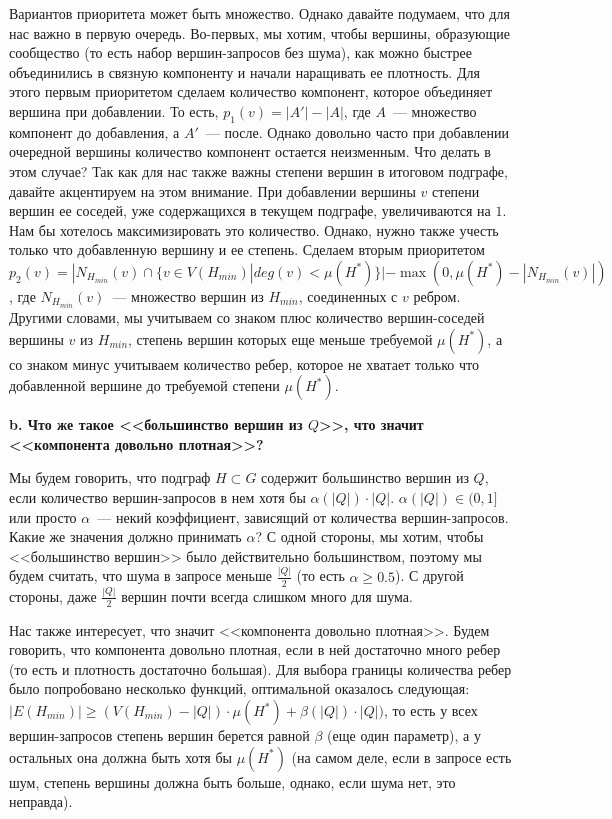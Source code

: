 Вариантов приоритета может быть множество. Однако давайте подумаем, что для нас важно в первую очередь. Во-первых, мы хотим, чтобы вершины, образующие сообщество (то есть набор вершин-запросов без шума), как можно быстрее объединились в связную компоненту и начали наращивать ее плотность. Для этого первым приоритетом сделаем количество компонент, которое объединяет вершина при добавлении. То есть, $p_1(v) = |A'| - |A|$, где $A$~--- множество компонент до добавления, а $A'$~--- после. Однако довольно часто при добавлении очередной вершины количество компонент остается неизменным. Что делать в этом случае? Так как для нас также важны степени вершин в итоговом подграфе, давайте акцентируем на этом внимание. При добавлении вершины $v$ степени вершин ее соседей, уже содержащихся в текущем подграфе, увеличиваются на $1$. Нам бы хотелось максимизировать это количество. Однако, нужно также учесть только что добавленную вершину и ее степень. Сделаем вторым приоритетом $p_2(v) = |N_{H_{min}}(v) \cap \{v \in V(H_{min}) | deg(v) < \mu(H^*)\}| - \max(0, \mu(H^*) - |N_{H_{min}}(v)|)$, где $N_{H_{min}}(v)$~--- множество вершин из $H_{min}$, соединенных с $v$ ребром. Другими словами, мы учитываем со знаком плюс количество вершин-соседей вершины $v$ из $H_{min}$, степень вершин которых еще меньше требуемой $\mu(H^*)$, а со знаком минус учитываем количество ребер, которое не хватает только что добавленной вершине до требуемой степени $\mu(H^*)$.

\textbf{b. Что же такое <<большинство вершин из $Q$>>, что значит <<компонента довольно плотная>>?}

Мы будем говорить, что подграф $H \subset G$ содержит большинство вершин из $Q$, если количество вершин-запросов в нем хотя бы $\alpha(|Q|) \cdot |Q|$. $\alpha(|Q|) \in (0, 1]$ или просто $\alpha$~--- некий коэффициент, зависящий от количества вершин-запросов. Какие же значения должно принимать $\alpha$? С одной стороны, мы хотим, чтобы <<большинство вершин>> было действительно большинством, поэтому мы будем считать, что шума в запросе меньше $\frac{|Q|}{2}$ (то есть $\alpha \ge 0.5$). С другой стороны, даже $\frac{|Q|}{2}$ вершин почти всегда слишком много для шума.  

Нас также интересует, что значит <<компонента довольно плотная>>. Будем говорить, что компонента довольно плотная, если в ней достаточно много ребер (то есть и плотность достаточно большая). Для выбора границы количества ребер было попробовано несколько функций, оптимальной оказалось следующая: $|E(H_{min})| \ge (V(H_{min}) - |Q|) \cdot \mu(H^*) + \beta(|Q|) \cdot |Q|)$, то есть у всех вершин-запросов степень вершин берется равной $\beta$ (еще один параметр), а у остальных она должна быть хотя бы $\mu(H^*)$ (на самом деле, если в запросе есть шум, степень вершины должна быть больше, однако, если шума нет, это неправда). 

